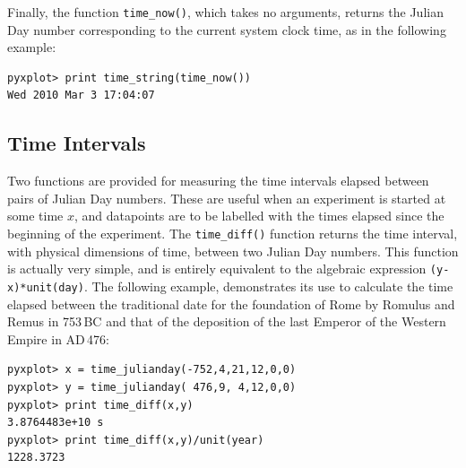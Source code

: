Finally, the function {\tt time\_now()}, which takes no
arguments, returns the Julian Day number corresponding to the current system
clock time, as in the following example:
\begin{verbatim}
pyxplot> print time_string(time_now())
Wed 2010 Mar 3 17:04:07
\end{verbatim}


\subsection{Time Intervals}

Two functions are provided for measuring the time intervals elapsed between
pairs of Julian Day numbers.  These are useful when an experiment is started at
some time $x$, and datapoints are to be labelled with the times elapsed since
the beginning of the experiment. The {\tt time\_diff()}
function returns the time
interval, with physical dimensions of time, between two Julian Day numbers.
This function is actually very simple, and is entirely equivalent to the
algebraic expression {\tt (y-x)*unit(day)}. The following example, demonstrates
its use to calculate the time elapsed between the traditional date for the
foundation of Rome by Romulus and Remus in 753\,{\footnotesize BC} and that of
the deposition of the last Emperor of the Western Empire in {\footnotesize
AD}\,476:

\begin{verbatim}
pyxplot> x = time_julianday(-752,4,21,12,0,0)
pyxplot> y = time_julianday( 476,9, 4,12,0,0)
pyxplot> print time_diff(x,y)
3.8764483e+10 s
pyxplot> print time_diff(x,y)/unit(year)
1228.3723
\end{verbatim}

